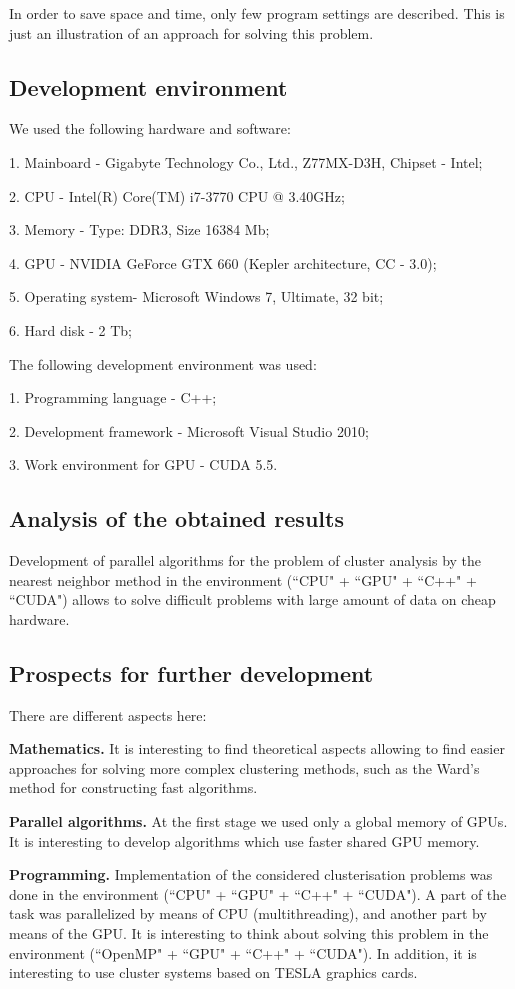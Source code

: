\documentclass{TAACpaper}
\begin{document}
In order to save space and time, only few program settings are described. This is just an illustration of an approach for solving this problem.

\subsection{Development environment}
We used the following hardware and software:

1.	Mainboard - Gigabyte Technology Co., Ltd., Z77MX-D3H, Chipset - Intel;

2.	CPU - Intel(R) Core(TM)  i7-3770 CPU @ 3.40GHz;

3.	Memory - Type: DDR3, Size 16384 Mb;

4.	GPU - NVIDIA GeForce GTX 660 (Kepler architecture, CC - 3.0);

5.	Operating system- Microsoft Windows 7, Ultimate, 32 bit;

6.	Hard disk - 2 Tb;

The following development environment was used:


1.	Programming language - C++;

2.	Development framework - Microsoft Visual Studio 2010;

3.	Work environment for GPU - CUDA 5.5.


\subsection{Analysis of the obtained results}
Development of parallel algorithms for the problem of cluster analysis by the nearest neighbor method in the environment (``CPU" + ``GPU" + ``C++" + ``CUDA") allows to solve difficult problems with large amount of data on cheap hardware.

\subsection{Prospects for further development}
There are different aspects here: 

\textbf {Mathematics.} It is interesting to find theoretical aspects allowing to find easier approaches for solving more complex clustering methods, such as the Ward's method for constructing fast algorithms.

\textbf {Parallel algorithms.} At the first stage we used only a global memory of GPUs. It is interesting to develop algorithms which use faster shared GPU memory. 

\textbf {Programming.} Implementation of the considered clusterisation problems was done in the environment (``CPU" + ``GPU" + ``C++" + ``CUDA"). A part of the task was parallelized by means of CPU (multithreading), and another part by means of the GPU. It is interesting to think about solving this problem in the environment (``OpenMP" + ``GPU" + ``C++" + ``CUDA"). In addition, it is interesting to use cluster systems based on TESLA graphics cards.
\end{document}
